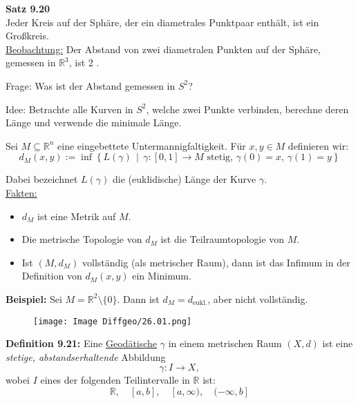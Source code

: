 \documentclass[fleqn, 12pt, letterpaper]{article}
\newcommand{\txt}[1]{\text{#1}}
\begin{document}
\textbf{Satz 9.20}\\
Jeder Kreis auf der Sphäre, der ein diametrales Punktpaar enthält, ist ein Großkreis.\\

\underline{Beobachtung:}
Der Abstand von zwei diametralen Punkten auf der Sphäre, gemessen in \( \mathbb{R}^3 \), ist 2 \quad {}.

\medskip

{Frage:} Was ist der Abstand gemessen in \( S^2 \)?

{Idee:} Betrachte alle Kurven in \( S^2 \), welche zwei Punkte verbinden, berechne deren Länge und verwende die minimale Länge.

\medskip

Sei \( M \subseteq \mathbb{R}^n \) eine eingebettete Untermannigfaltigkeit. Für \( x, y \in M \) definieren wir:
\[
d_M(x, y) := \inf \left\{ L(\gamma) \,\middle|\, \gamma \colon [0,1] \to M \text{ stetig},\, \gamma(0) = x,\, \gamma(1) = y \right\}
\]

Dabei bezeichnet \( L(\gamma) \) die (euklidische) Länge der Kurve \( \gamma \).\\

\underline{Fakten:}
\begin{itemize}
    \item \( d_M \) ist eine Metrik auf \( M \).
    
    \item Die metrische Topologie von \( d_M \) ist die Teilraumtopologie von \( M \).
    
    \item Ist \( (M, d_M) \) vollständig (als metrischer Raum), dann ist das Infimum in der Definition von \( d_M(x,y) \) ein Minimum.
\end{itemize}

\medskip

\textbf{Beispiel:} Sei \( M = \mathbb{R}^2 \setminus \{0\} \). Dann ist \( d_M = d_{\txt{eukl.}} \), aber nicht vollständig.
      \begin{figure}[H]
    \centering
    \texttt{[image: Image Diffgeo/26.01.png]}
 \end{figure}
 
\textbf{Definition 9.21:}  
Eine \underline{Geodätische} \( \gamma \) in einem metrischen Raum \( (X, d) \) ist eine \emph{stetige, abstandserhaltende} Abbildung
\[
\gamma \colon I \to X,
\]
wobei \( I \) eines der folgenden Teilintervalle in \( \mathbb{R} \) ist:
\[
\mathbb{R},\quad [a, b],\quad [a, \infty),\quad (-\infty, b]
\]
\end{document}
